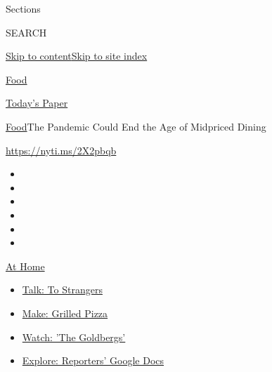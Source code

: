 Sections

SEARCH

\protect\hyperlink{site-content}{Skip to
content}\protect\hyperlink{site-index}{Skip to site index}

\href{https://www.nytimes3xbfgragh.onion/section/food}{Food}

\href{https://myaccount.nytimes3xbfgragh.onion/auth/login?response_type=cookie\&client_id=vi}{}

\href{https://www.nytimes3xbfgragh.onion/section/todayspaper}{Today's
Paper}

\href{/section/food}{Food}\textbar{}The Pandemic Could End the Age of
Midpriced Dining

\url{https://nyti.ms/2X2pbqb}

\begin{itemize}
\item
\item
\item
\item
\item
\item
\end{itemize}

\href{https://www.nytimes3xbfgragh.onion/spotlight/at-home?action=click\&pgtype=Article\&state=default\&region=TOP_BANNER\&context=at_home_menu}{At
Home}

\begin{itemize}
\tightlist
\item
  \href{https://www.nytimes3xbfgragh.onion/2020/08/03/well/family/the-benefits-of-talking-to-strangers.html?action=click\&pgtype=Article\&state=default\&region=TOP_BANNER\&context=at_home_menu}{Talk:
  To Strangers}
\item
  \href{https://www.nytimes3xbfgragh.onion/2020/08/01/at-home/coronavirus-make-pizza-on-a-grill.html?action=click\&pgtype=Article\&state=default\&region=TOP_BANNER\&context=at_home_menu}{Make:
  Grilled Pizza}
\item
  \href{https://www.nytimes3xbfgragh.onion/2020/07/31/arts/television/goldbergs-abc-stream.html?action=click\&pgtype=Article\&state=default\&region=TOP_BANNER\&context=at_home_menu}{Watch:
  'The Goldbergs'}
\item
  \href{https://www.nytimes3xbfgragh.onion/interactive/2020/at-home/even-more-reporters-editors-diaries-lists-recommendations.html?action=click\&pgtype=Article\&state=default\&region=TOP_BANNER\&context=at_home_menu}{Explore:
  Reporters' Google Docs}
\end{itemize}


